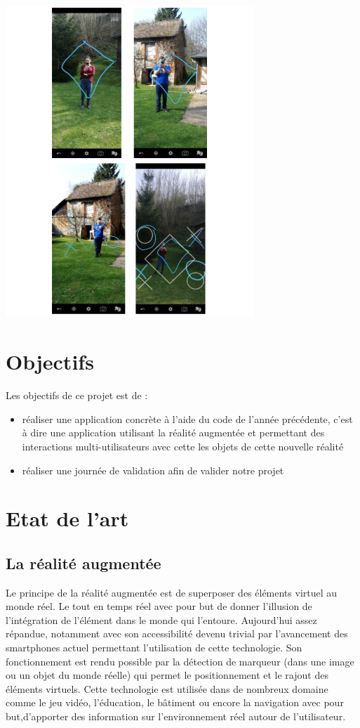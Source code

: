 \documentclass[12pt]{article}
\begin{document}
\begin{center}		\includegraphics[width=0.7\textwidth]{intro.png}
\end{center}


\section{Objectifs}
Les objectifs de ce projet est de :
\begin{itemize}
\item réaliser une application concrète à l'aide du code de l'année précédente, c'est à dire une application utilisant la réalité augmentée et permettant des interactions multi-utilisateurs avec cette les objets de cette nouvelle réalité
\item réaliser une journée de validation afin de valider notre projet
\end{itemize}


\section{Etat de l'art}
\subsection{La réalité augmentée}
Le principe de la réalité augmentée est de superposer des éléments virtuel au monde réel. Le tout en temps réel avec pour but de donner l'illusion de l'intégration de l'élément dans le monde qui l'entoure. Aujourd'hui assez répandue, notamment avec son accessibilité devenu trivial par l'avancement des smartphones actuel permettant l'utilisation de cette technologie.
Son fonctionnement est rendu possible par la détection de marqueur (dans une image ou un objet du monde réelle) qui permet le positionnement et le rajout des éléments virtuels. 
Cette technologie est utilisée dans de nombreux domaine comme le jeu vidéo, l'éducation, le bâtiment ou encore la navigation avec pour but,d'apporter des information sur l'environnement réel autour de l'utilisateur.
\end{document}
